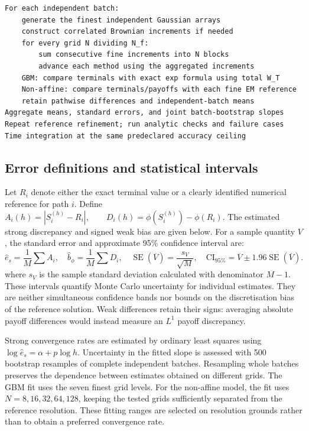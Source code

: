 \begin{lstlisting}[language={},caption={Coupled experiment pseudocode; reference and method paths use the same increments.},label={alg:coupled}]
For each independent batch:
    generate the finest independent Gaussian arrays
    construct correlated Brownian increments if needed
    for every grid N dividing N_f:
        sum consecutive fine increments into N blocks
        advance each method using the aggregated increments
    GBM: compare terminals with exact exp formula using total W_T
    Non-affine: compare terminals/payoffs with each fine EM reference
    retain pathwise differences and independent-batch means
Aggregate means, standard errors, and joint batch-bootstrap slopes
Repeat reference refinement; run analytic checks and failure cases
Time integration at the same predeclared accuracy ceiling
\end{lstlisting}

\subsection{Error definitions and statistical intervals}
Let $R_i$ denote either the exact terminal value or a clearly identified numerical reference for path $i$. Define $A_i(h)=|S_i^{(h)}-R_i|, \qquad D_i(h)=\phi(S_i^{(h)})-\phi(R_i).$ The estimated strong discrepancy and signed weak bias are given below. For a sample quantity $V$, the standard error and approximate 95\% confidence interval are:
\begin{equation}\label{eq:ci}
\widehat e_s=\frac1M\sum A_i,\quad
\widehat b_\phi=\frac1M\sum D_i,\quad
\operatorname{SE}(\overline V)=\frac{s_V}{\sqrt M},\quad
\mathrm{CI}_{95\%}=\overline V\pm1.96\operatorname{SE}(\overline V).
\end{equation}
where $s_V$ is the sample standard deviation calculated with denominator $M-1$. These intervals quantify Monte Carlo uncertainty for individual estimates. They are neither simultaneous confidence bands nor bounds on the discretisation bias of the reference solution. Weak differences retain their signs: averaging absolute payoff differences would instead measure an $L^1$ payoff discrepancy.

Strong convergence rates are estimated by ordinary least squares using $\log\widehat e_s=\alpha+p\log h.$ Uncertainty in the fitted slope is assessed with 500 bootstrap resamples of complete independent batches. Resampling whole batches preserves the dependence between estimates obtained on different grids. The GBM fit uses the seven finest grid levels. For the non-affine model, the fit uses $N=8,16,32,64,128$, keeping the tested grids sufficiently separated from the reference resolution. These fitting ranges are selected on resolution grounds rather than to obtain a preferred convergence rate.

